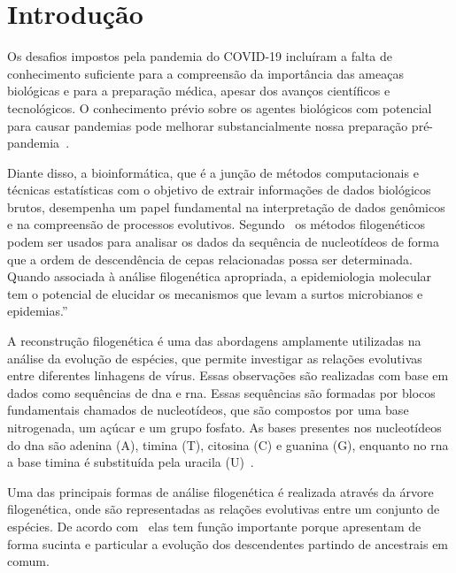 
\chapter{Introdução}

\setlength{\parskip}{0.3cm}

Os desafios impostos pela pandemia do COVID-19 incluíram a falta de conhecimento suficiente para a compreensão da importância das ameaças biológicas e para a preparação médica, apesar dos avanços científicos e tecnológicos. O conhecimento prévio sobre os agentes biológicos com potencial para causar pandemias pode melhorar substancialmente nossa preparação pré-pandemia~\cite{behl_threat_2022}.

Diante disso, a bioinformática, que é a junção de métodos computacionais e técnicas estatísticas com o objetivo de extrair informações de dados biológicos brutos, desempenha um papel fundamental na interpretação de dados genômicos e na compreensão de processos evolutivos.
Segundo~\citeauthor{barry_phylogenetic_analysis_2006} os métodos filogenéticos podem ser usados para analisar os dados da sequência de nucleotídeos de forma que a ordem de descendência de cepas relacionadas possa ser determinada. Quando associada à análise filogenética apropriada, a epidemiologia molecular tem o potencial de elucidar os mecanismos que levam a surtos microbianos e epidemias.''

A reconstrução filogenética é uma das abordagens amplamente utilizadas na análise da evolução de espécies, que permite investigar as relações evolutivas entre diferentes linhagens de vírus. Essas observações são realizadas com base em dados como sequências de \gls{dna} e \gls{rna}. Essas sequências são formadas por blocos fundamentais chamados de nucleotídeos, que são compostos por uma base nitrogenada, um açúcar e um grupo fosfato. As bases presentes nos nucleotídeos do \gls{dna} são adenina (A), timina (T), citosina (C) e guanina (G), enquanto no \gls{rna} a base timina é substituída pela uracila (U)~\cite{alberts2002molecular}.

Uma das principais formas de análise filogenética é realizada através da árvore filogenética, onde são representadas as relações evolutivas entre um conjunto de espécies. De acordo com~\citeauthor{morrison_tree_thinking} elas tem função importante porque apresentam de forma sucinta e particular a evolução dos descendentes partindo de ancestrais em comum.

